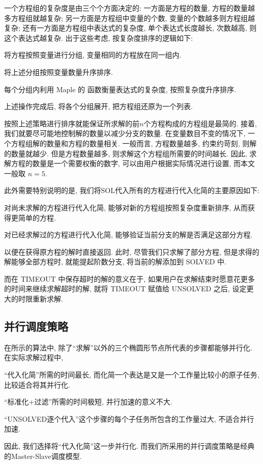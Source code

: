 一个方程组的复杂度是由三个个方面决定的: 一方面是方程的数量, 方程的数量越多方程组就越复杂; 另一方面是方程组中变量的个数, 变量的个数越多则方程组越复杂; 还有一方面是方程组中表达式的复杂度, 单个表达式长度越长, 次数越高, 则这个表达式越复杂. 出于这些考虑, 按复杂度排序的逻辑如下:
\begin{compactenum}[(1)]
\item 将方程按照变量进行分组, 变量相同的方程放在同一组内.
\item 将上述分组按照变量数量升序排序.
\item 每个分组内利用 Maple 的  函数衡量表达式的复杂度, 按照复杂度升序排序.  
\item 上述操作完成后, 将各个分组展开, 把方程组还原为一个列表. 
\end{compactenum}

按照上述策略进行排序就能保证所求解的前$n$个方程构成的方程组是最简的. 接着, 我们就要尽可能地控制解的数量以减少分支的数量. 在变量数目不变的情况下, 一个方程组解的数量和方程的数量相关. 一般而言, 方程数量越多, 约束约苛刻, 则解的数量就越少. 但是方程数量越多, 则求解这个方程组所需要的时间越长. 因此, 求解方程的数量是一个需要权衡的数字, 可以由用户根据实际情况进行设置, 而本文一般取 $n=5$.

此外需要特别说明的是, 我们将SOL代入所有的方程进行代入化简的主要原因如下: 
\begin{compactenum}[(1)]
\item 对尚未求解的方程进行代入化简, 能够对新的方程组按照复杂度重新排序, 从而获得更简单的方程.
\item 对已经求解过的方程进行代入化简, 能够验证当前分支的解是否满足这部分方程. 
\item 以便在获得原方程的解时直接返回. 此时, 尽管我们只求解了部分方程, 但是求得的解能够全部方程时, 就能提起阶数分支, 将当前的解添加到 SOLVED 中. 
\end{compactenum} 

而在 TIMEOUT 中保存超时的解的意义在于, 如果用户在求解结束时愿意花更多的时间来继续求解超时的解, 就将 TIMEOUT 赋值给 UNSOLVED 之后, 设定更大的时限重新求解. 

\subsection{并行调度策略} 
在所示的算法中, 除了``求解''以外的三个椭圆形节点所代表的步骤都能够并行化. 在实际求解过程中, 
\begin{compactitem}[\textbullet]
\item ``代入化简''所需的时间最长, 而化简一个表达是又是一个工作量比较小的原子任务, 比较适合将其并行化.
\item ``标准化+过滤''所需的时间极短, 并行加速的意义不大.
\item ``UNSOLVED逐个代入''这个步骤的每个子任务所包含的工作量过大, 不适合并行加速.
\end{compactitem}
因此, 我们选择将``代入化简''这一步并行化. 而我们所采用的并行调度策略是经典的Master-Slave调度模型\cite{sahni1996master}. 

